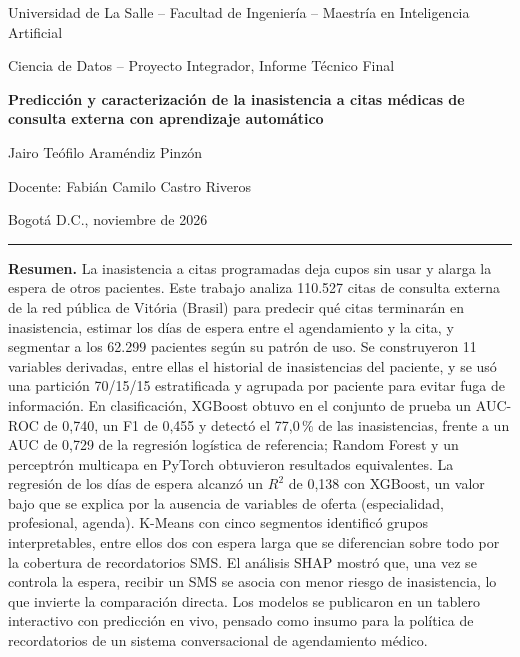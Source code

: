 \documentclass[11pt,letterpaper]{article}
\begin{document}
\begin{center}
{\small Universidad de La Salle -- Facultad de Ingeniería -- Maestría en Inteligencia Artificial\par}
{\small Ciencia de Datos -- Proyecto Integrador, Informe Técnico Final\par}
\vspace{0.8cm}
{\LARGE\bfseries Predicción y caracterización de la inasistencia a citas médicas de consulta externa con aprendizaje automático\par}
\vspace{0.6cm}
{\large Jairo Teófilo Araméndiz Pinzón\par}
{\small Docente: Fabián Camilo Castro Riveros\par}
{\small Bogotá D.C., noviembre de 2026\par}
\end{center}

\vspace{0.4cm}
\noindent\rule{\textwidth}{0.4pt}

\textbf{Resumen.} La inasistencia a citas programadas deja cupos sin usar y alarga la espera de otros pacientes. Este trabajo analiza 110.527 citas de consulta externa de la red pública de Vitória (Brasil) para predecir qué citas terminarán en inasistencia, estimar los días de espera entre el agendamiento y la cita, y segmentar a los 62.299 pacientes según su patrón de uso. Se construyeron 11 variables derivadas, entre ellas el historial de inasistencias del paciente, y se usó una partición 70/15/15 estratificada y agrupada por paciente para evitar fuga de información. En clasificación, XGBoost obtuvo en el conjunto de prueba un AUC-ROC de 0,740, un F1 de 0,455 y detectó el 77,0\,\% de las inasistencias, frente a un AUC de 0,729 de la regresión logística de referencia; Random Forest y un perceptrón multicapa en PyTorch obtuvieron resultados equivalentes. La regresión de los días de espera alcanzó un $R^2$ de 0,138 con XGBoost, un valor bajo que se explica por la ausencia de variables de oferta (especialidad, profesional, agenda). K-Means con cinco segmentos identificó grupos interpretables, entre ellos dos con espera larga que se diferencian sobre todo por la cobertura de recordatorios SMS. El análisis SHAP mostró que, una vez se controla la espera, recibir un SMS se asocia con menor riesgo de inasistencia, lo que invierte la comparación directa. Los modelos se publicaron en un tablero interactivo con predicción en vivo, pensado como insumo para la política de recordatorios de un sistema conversacional de agendamiento médico.
\end{document}
